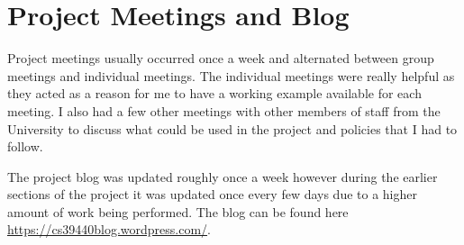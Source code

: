 \section{Project Meetings and Blog}
Project meetings usually occurred once a week and alternated between group meetings and individual meetings. The individual meetings were really helpful as they acted as a reason for me to have a working example available for each meeting. I also had a few other meetings with other members of staff from the University to discuss what could be used in the project and policies that I had to follow. 

The project blog was updated roughly once a week however during the earlier sections of the project it was updated once every few days due to a higher amount of work being performed. The blog can be found here \href{https://cs39440blog.wordpress.com/}{https://cs39440blog.wordpress.com/}.